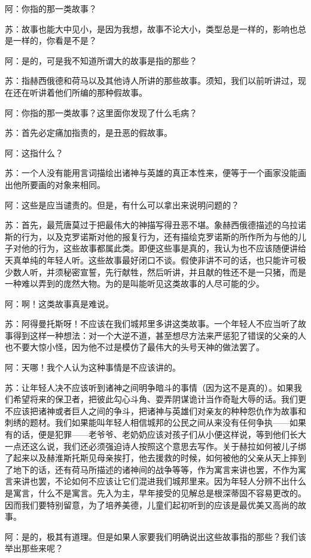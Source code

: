 \documentclass[11pt,oneside]{book}
\begin{document}
\begin{common-format}
阿：你指的那一类故事？

苏：故事也能大中见小，是因为我想，故事不论大小，类型总是一样的，影响也总是一样的，你看是不是？

阿：是的，可是我不知道所谓大的故事是指的那些？

苏：指赫西俄德和荷马以及其他诗人所讲的那些故事。须知，我们以前听讲过，现在还在听讲着他们所编的那种假故事。

阿：你指的那一类故事？这里面你发现了什么毛病？

苏：首先必定痛加指责的，是丑恶的假故事。

阿：这指什么？

苏：一个人没有能用言词描绘出诸神与英雄的真正本性来，便等于一个画家没能画出他所要画的对象来相同。

阿：这些是应当谴责的。但是，有什么可以拿出来说明问题的？

苏：首先，最荒唐莫过于把最伟大的神描写得丑恶不堪。象赫西俄德描述的乌拉诺斯的行为，以及克罗诺斯对他的报复行为，还有描绘克罗诺斯的所作所为与他的儿子对他的行为，这些故事都属此类。即便这些事是真的，我认为也不应该随便讲给天真单纯的年轻人听。这些故事最好闭口不谈。假使非讲不可的话，也只能许可极少数人听，并须秘密宣誓，先行献牲，然后听讲，并且献的牲还不是一只猪，而是一种难以弄到的庞然大物。为的是叫能听见这类故事的人尽可能的少。

阿：啊！这类故事真是难说。

苏：阿得曼托斯呀！不应该在我们城邦里多讲这类故事。一个年轻人不应当听了故事得到这样一种想法：对一个大逆不道，甚至想尽方法来严惩犯了错误的父亲的人也不要大惊小怪，因为他不过是模仿了最伟大的头号天神的做法罢了。

阿：天哪！我个人认为这种事情是不应该讲的。

苏：让年轻人决不应该听到诸神之间明争暗斗的事情（因为这不是真的）。如果我们希望将来的保卫者，把彼此勾心斗角、耍弄阴谋诡计当作奇耻大辱的话。我们更不应该把诸神或者巨人之间的争斗，把诸神与英雄们对亲友的种种怨仇作为故事和刺绣的题材。我们如果能叫年轻人相信城邦的公民之间从来没有任何争执——如果有的话，便是犯罪——老爷爷、老奶奶应该对孩子们从小便这样说，等到他们长大一点还这么说，我们还必须强迫诗人按照这个意思去写作。关于赫拉如何被儿子绑了起来以及赫淮斯托斯见母亲挨打，他去援救的时候，如何被他的父亲从天上摔到了地下的话，还有荷马所描述的诸神间的战争等等，作为寓言来讲也罢，不作为寓言来讲也罢，不论如何不应该让它们混进我们城邦里来。因为年轻人分辨不出什么是寓言，什么不是寓言。先入为主，早年接受的见解总是根深蒂固不容易更改的。因而我们要特别留意，为了培养美德，儿童们起初听到的应该是最优美又高尚的故事。

阿：是的，极其有道理。但是如果人家要我们明确说出这些故事指的那些？我们该举出那些来呢？


\end{common-format}
\end{document}
